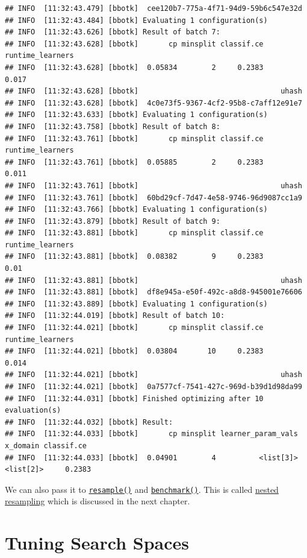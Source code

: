 \documentclass[
]{scrbook}
\begin{document}
\begin{verbatim}
## INFO  [11:32:43.479] [bbotk]  cee120b7-775a-4f71-94d9-59b6c547e32d 
## INFO  [11:32:43.484] [bbotk] Evaluating 1 configuration(s) 
## INFO  [11:32:43.626] [bbotk] Result of batch 7: 
## INFO  [11:32:43.628] [bbotk]       cp minsplit classif.ce runtime_learners 
## INFO  [11:32:43.628] [bbotk]  0.05834        2     0.2383            0.017 
## INFO  [11:32:43.628] [bbotk]                                 uhash 
## INFO  [11:32:43.628] [bbotk]  4c0e73f5-9367-4cf2-95b8-c7aff12e91e7 
## INFO  [11:32:43.633] [bbotk] Evaluating 1 configuration(s) 
## INFO  [11:32:43.758] [bbotk] Result of batch 8: 
## INFO  [11:32:43.761] [bbotk]       cp minsplit classif.ce runtime_learners 
## INFO  [11:32:43.761] [bbotk]  0.05885        2     0.2383            0.011 
## INFO  [11:32:43.761] [bbotk]                                 uhash 
## INFO  [11:32:43.761] [bbotk]  60bd29cf-7d47-4e58-9746-96d9087cc1a9 
## INFO  [11:32:43.766] [bbotk] Evaluating 1 configuration(s) 
## INFO  [11:32:43.879] [bbotk] Result of batch 9: 
## INFO  [11:32:43.881] [bbotk]       cp minsplit classif.ce runtime_learners 
## INFO  [11:32:43.881] [bbotk]  0.08382        9     0.2383             0.01 
## INFO  [11:32:43.881] [bbotk]                                 uhash 
## INFO  [11:32:43.881] [bbotk]  df8e945a-e50f-492c-a8d8-945001e76606 
## INFO  [11:32:43.889] [bbotk] Evaluating 1 configuration(s) 
## INFO  [11:32:44.019] [bbotk] Result of batch 10: 
## INFO  [11:32:44.021] [bbotk]       cp minsplit classif.ce runtime_learners 
## INFO  [11:32:44.021] [bbotk]  0.03804       10     0.2383            0.014 
## INFO  [11:32:44.021] [bbotk]                                 uhash 
## INFO  [11:32:44.021] [bbotk]  0a7577cf-7541-427c-969d-b39d1d98da99 
## INFO  [11:32:44.031] [bbotk] Finished optimizing after 10 evaluation(s) 
## INFO  [11:32:44.032] [bbotk] Result: 
## INFO  [11:32:44.033] [bbotk]       cp minsplit learner_param_vals  x_domain classif.ce 
## INFO  [11:32:44.033] [bbotk]  0.04901        4          <list[3]> <list[2]>     0.2383
\end{verbatim}

We can also pass it to \href{https://mlr3.mlr-org.com/reference/resample.html}{\texttt{resample()}} and \href{https://mlr3.mlr-org.com/reference/benchmark.html}{\texttt{benchmark()}}. This is called \protect\hyperlink{nested-resampling}{nested resampling} which is discussed in the next chapter.

\hypertarget{searchspace}{%
\section{Tuning Search Spaces}\label{searchspace}}
\end{document}

